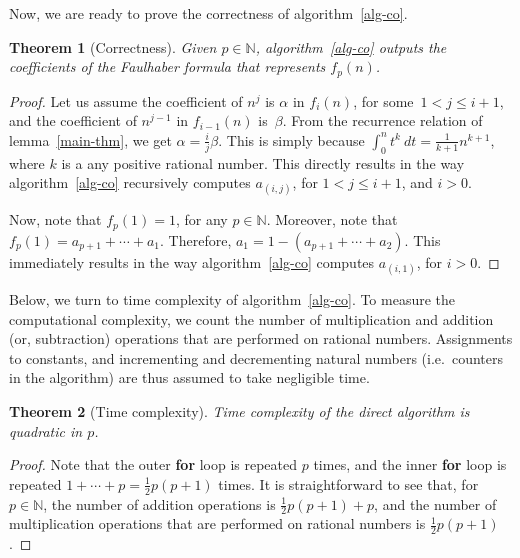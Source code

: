 \documentclass[a4paper,10pt]{amsart}
\newtheorem{theorem}{Theorem}
\theoremstyle{remark}
\newcommand{\nat}{\mathbb{N}}
\begin{document}
Now, we are ready to prove the correctness of algorithm~\ref{alg-co}.
\begin{theorem}[Correctness]
Given $p\in\nat$, algorithm~\ref{alg-co} outputs the
coefficients of the Faulhaber formula that represents $f_p(n)$.
\end{theorem}
\begin{proof}
Let us assume the coefficient of $n^j$ is $\alpha$ in $f_i(n)$, for
some~$1<j\le i+1$, and the coefficient of $n^{j-1}$ in $f_{i-1}(n)$
is~$\beta$. From the recurrence relation of lemma~\ref{main-thm}, we
get $\alpha=\frac{i}{j}\beta$. This is simply because $\int_0^n t^k\
dt= \frac{1}{k+1} n^{k+1}$, where $k$ is a any positive rational
number. This directly results in the way  algorithm~\ref{alg-co}
recursively computes $a_{(i,j)}$, for $1<j\le i+1$, and $i>0$.

Now, note that $f_p(1)=1$, for any $p\in\nat$. Moreover, note that
$f_p(1)=a_{p+1}+\cdots+a_1$. Therefore,
$a_1=1-(a_{p+1}+\cdots+a_2)$. This immediately results in the way
algorithm~\ref{alg-co} computes $a_{(i,1)}$, for $i>0$.
\end{proof}

Below, we turn to time complexity of algorithm~\ref{alg-co}.  To
measure the computational complexity, we count the number of
multiplication and addition (or, subtraction) operations that are
performed on rational numbers.  Assignments to constants, and
incrementing and decrementing natural numbers (i.e.\ counters in the
algorithm) are thus assumed to take negligible time.

\begin{theorem}[Time complexity]
Time complexity of the direct algorithm is quadratic in $p$.
\end{theorem}
\begin{proof}
Note that the outer \textbf{for} loop is repeated $p$ times, and the
inner \textbf{for} loop is repeated $1+\cdots+p=\frac{1}{2} p (p+1)$
times. It is straightforward to see that, for $p\in\nat$, the number
of addition operations is $\frac{1}{2}p(p+1)+p$, and the number of
multiplication operations that are performed on rational numbers is
$\frac{1}{2}p(p+1)$.
\end{proof}







\end{document}
